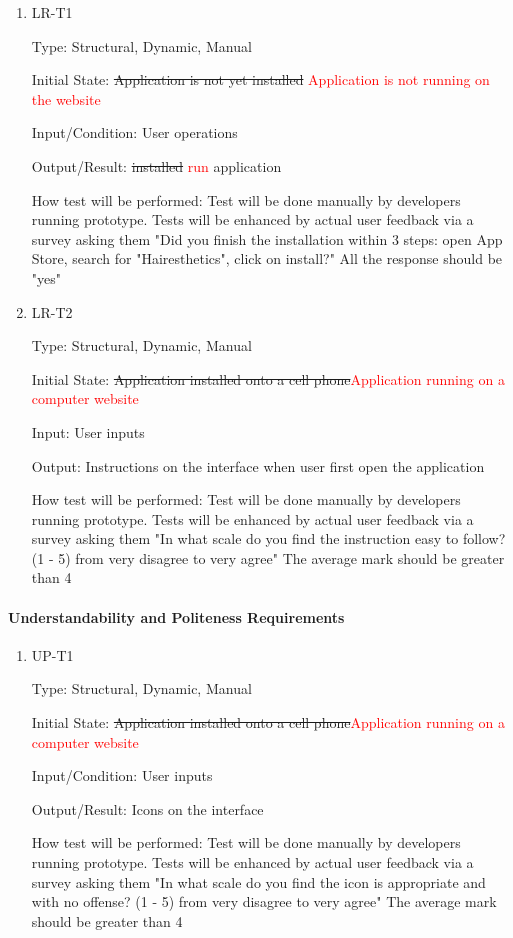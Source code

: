 \documentclass[12pt, titlepage]{article}
\begin{document}
\begin{enumerate}

\item{LR-T1\\}

Type: Structural, Dynamic, Manual
					
Initial State: \sout{Application is not yet installed} \textcolor{red}{Application is not running on the website}
					
Input/Condition: User operations
					
Output/Result: \sout{installed} \textcolor{red}{run} application
					
How test will be performed: Test will be done manually by developers running prototype. Tests will be enhanced by actual user feedback via a survey asking them "Did you finish the installation within 3 steps: open App Store, search for "Hairesthetics", click on install?" All the response should be "yes"
					
\item{LR-T2\\}

Type: Structural, Dynamic, Manual
					
Initial State: \sout{Application installed onto a cell phone}\textcolor{red}{Application running on a computer website}
					
Input: User inputs
					
Output: Instructions on the interface when user first open the application
					
How test will be performed: Test will be done manually by developers running prototype. Tests will be enhanced by actual user feedback via a survey asking them "In what scale do you find the instruction easy to follow? (1 - 5) from very disagree to very agree" The average mark should be greater than 4

\end{enumerate}

\paragraph{Understandability and Politeness Requirements}

\begin{enumerate}

\item{UP-T1\\}

Type: Structural, Dynamic, Manual
					
Initial State: \sout{Application installed onto a cell phone}\textcolor{red}{Application running on a computer website}
					
Input/Condition: User inputs
					
Output/Result: Icons on the interface
					
How test will be performed: Test will be done manually by developers running prototype. Tests will be enhanced by actual user feedback via a survey asking them "In what scale do you find the icon is appropriate and with no offense? (1 - 5) from very disagree to very agree" The average mark should be greater than 4

\end{enumerate}
\end{document}
